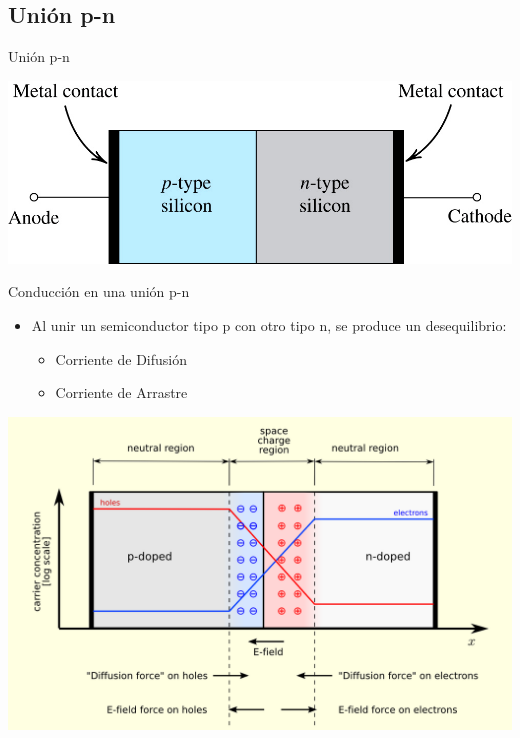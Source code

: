 \documentclass[xcolor={usenames,svgnames,dvipsnames}]{beamer}
\begin{document}
\subsection{Unión p-n}
\label{sec:org434178a}
\begin{frame}[label={sec:org68d184c}]{Unión p-n}
\begin{center}
\begin{center}
\includegraphics[width=.9\linewidth]{../figs/Union_PN.jpg}
\end{center}
\end{center}
\end{frame}


\begin{frame}[label={sec:orgf5bd119}]{Conducción en una unión p-n}
\begin{itemize}
\item Al \alert{unir un semiconductor tipo p con otro tipo n, se produce un desequilibrio}:
\begin{itemize}
\item Corriente de Difusión
\item Corriente de Arrastre
\end{itemize}
\end{itemize}

\begin{center}
\begin{center}
\includegraphics[width=.9\linewidth]{../figs/Pn-junction-equilibrium.png}
\end{center}
\end{center}
\end{frame}
\end{document}
